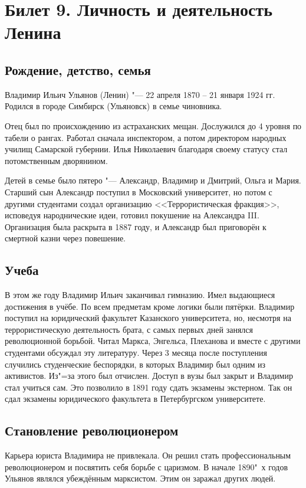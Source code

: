 \section{Билет 9. Личность и деятельность Ленина}

\subsection{Рождение, детство, семья}

Владимир Ильич Ульянов (Ленин) "--- 22 апреля 1870 -- 21 января 1924 гг. Родился в городе Симбирск (Ульяновск) в семье чиновника. 

Отец был по происхождению из астраханских мещан. Дослужился до 4 уровня по табели о рангах. Работал сначала инспектором, а потом директором народных училищ Самарской губернии. Илья Николаевич благодаря своему статусу стал потомственным дворянином.

Детей в семье было пятеро "--- Александр, Владимир и Дмитрий, Ольга и Мария. Старший сын Александр поступил в Московский университет, но потом с другими студентами создал организацию <<Террористическая фракция>>, исповедуя народнические идеи, готовил покушение на Александра III. Организация была раскрыта в 1887 году, и Александр был приговорён к смертной казни через повешение. 

\subsection{Учеба}

В этом же году Владимир Ильич заканчивал гимназию. Имел выдающиеся достижения в учёбе. По всем предметам кроме логики были пятёрки. Владимир поступил на юридический факультет Казанского университета, но, несмотря на террористическую деятельность брата, с самых первых дней занялся революционной борьбой. Читал Маркса, Энгельса, Плеханова и вместе с другими студентами обсуждал эту литературу. Через 3 месяца после поступления случились студенческие беспорядки, в которых Владимир был одним из активистов. Из"=за этого был отчислен. Доступ в вузы был закрыт и Владимир стал учиться сам. Это позволило в 1891 году сдать экзамены экстерном. Так он сдал экзамены юридического факультета в Петербургском университете.

\subsection{Становление революционером}

Карьера юриста Владимира не привлекала. Он решил стать профессиональным революционером и посвятить себя борьбе с царизмом. В начале 1890"~х годов Ульянов являлся убеждённым марксистом. Этим он заражал других людей.

